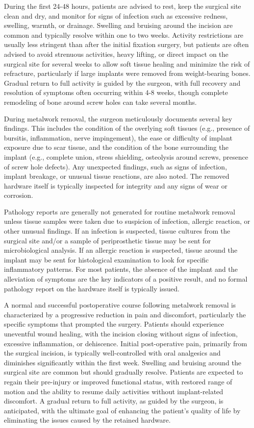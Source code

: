 During the first 24-48 hours, patients are advised to rest, keep the surgical site clean and dry, and monitor for signs of infection such as excessive redness, swelling, warmth, or drainage. Swelling and bruising around the incision are common and typically resolve within one to two weeks. Activity restrictions are usually less stringent than after the initial fixation surgery, but patients are often advised to avoid strenuous activities, heavy lifting, or direct impact on the surgical site for several weeks to allow soft tissue healing and minimize the risk of refracture, particularly if large implants were removed from weight-bearing bones. Gradual return to full activity is guided by the surgeon, with full recovery and resolution of symptoms often occurring within 4-8 weeks, though complete remodeling of bone around screw holes can take several months.

During metalwork removal, the surgeon meticulously documents several key findings. This includes the condition of the overlying soft tissues (e.g., presence of bursitis, inflammation, nerve impingement), the ease or difficulty of implant exposure due to scar tissue, and the condition of the bone surrounding the implant (e.g., complete union, stress shielding, osteolysis around screws, presence of screw hole defects). Any unexpected findings, such as signs of infection, implant breakage, or unusual tissue reactions, are also noted. The removed hardware itself is typically inspected for integrity and any signs of wear or corrosion.

Pathology reports are generally not generated for routine metalwork removal unless tissue samples were taken due to suspicion of infection, allergic reaction, or other unusual findings. If an infection is suspected, tissue cultures from the surgical site and/or a sample of periprosthetic tissue may be sent for microbiological analysis. If an allergic reaction is suspected, tissue around the implant may be sent for histological examination to look for specific inflammatory patterns. For most patients, the absence of the implant and the alleviation of symptoms are the key indicators of a positive result, and no formal pathology report on the hardware itself is typically issued.

A normal and successful postoperative course following metalwork removal is characterized by a progressive reduction in pain and discomfort, particularly the specific symptoms that prompted the surgery. Patients should experience uneventful wound healing, with the incision closing without signs of infection, excessive inflammation, or dehiscence. Initial post-operative pain, primarily from the surgical incision, is typically well-controlled with oral analgesics and diminishes significantly within the first week. Swelling and bruising around the surgical site are common but should gradually resolve. Patients are expected to regain their pre-injury or improved functional status, with restored range of motion and the ability to resume daily activities without implant-related discomfort. A gradual return to full activity, as guided by the surgeon, is anticipated, with the ultimate goal of enhancing the patient's quality of life by eliminating the issues caused by the retained hardware.

